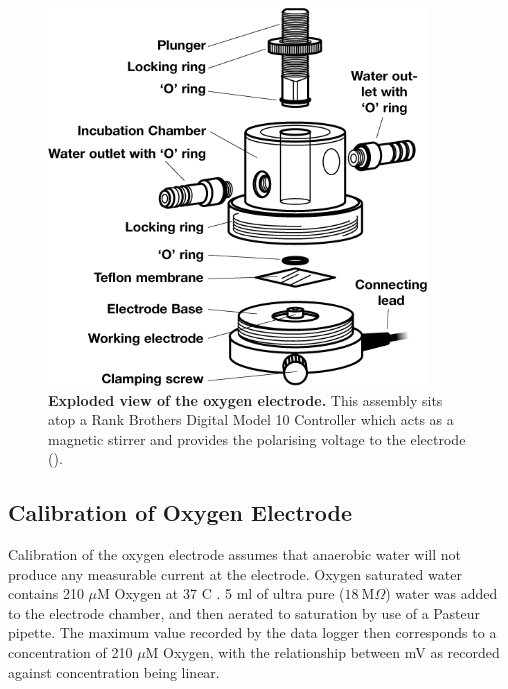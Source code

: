 \begin{figure}[!ht]
	\begin{center}
		\includegraphics[height=10cm]{02-materialsmethods/data/oxyexpp.png}
	\caption[Exploded view of the oxygen electrode]{{\bf Exploded view of the oxygen electrode.} This assembly sits atop a Rank Brothers Digital Model 10 Controller which acts as a magnetic stirrer and provides the polarising voltage to the electrode (\citet{Rank2012}).
	\label{fig:oxyexpp}}
	\end{center}
\end{figure}
\clearpage

\subsection{Calibration of Oxygen Electrode}
Calibration of the oxygen electrode assumes that anaerobic water will not produce any measurable current at the electrode. Oxygen saturated water contains 210 $\mu$M Oxygen at 37 \textdegree C \cite{YSI2012}. 5 ml of ultra pure ($18~\mathrm{M}\Omega$) water was added to the electrode chamber, and then aerated to saturation by use of a Pasteur pipette. The maximum value recorded by the data logger then corresponds to a concentration of 210 $\mu$M Oxygen, with the relationship between mV as recorded against concentration being linear.

